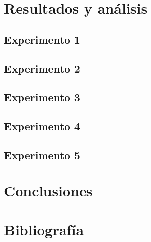 

\section{Resultados y análisis}

\subsection{Experimento 1}



\subsection{Experimento 2}



\subsection{Experimento 3}



\subsection{Experimento 4}



\subsection{Experimento 5}




\section{Conclusiones}


\section{Bibliografía}






